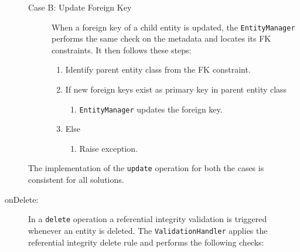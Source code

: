 \begin{description}
\begin{description}
		 
		\item[Case B: Update Foreign Key] When a foreign key of a child entity is
		updated, the  \texttt{EntityManager} performs the same check on the
		metadata and locates its \ac{FK} constraints. It then follows these steps:
		\begin{enumerate}
		  \item Identify parent entity class from the \ac{FK} constraint.
		  \item If new foreign keys exist as primary key in parent entity class
			\begin{enumerate}
				\item \texttt{EntityManager} updates  the foreign key.
			\end{enumerate}
		  \item Else 
			\begin{enumerate}
				\item Raise exception.
			\end{enumerate}
		\end{enumerate}

	
		
		\end{description}
		The implementation of the \texttt{update} operation for both the cases is
		consistent for all solutions.
		
		\item[onDelete:] In a \texttt{delete} operation a referential
		integrity validation is triggered whenever an entity is deleted. The
		\texttt{ValidationHandler} applies the referential integrity delete rule
		and performs the following checks:
		\renewcommand{\labelenumii}{\arabic{enumi}.\arabic{enumii}}
		\renewcommand{\labelenumiii}{\arabic{enumi}.\arabic{enumii}.\arabic{enumiii}}
		

\end{description}

